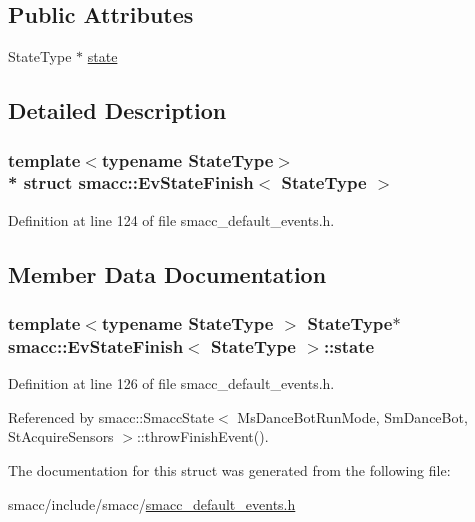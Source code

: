 \subsection*{Public Attributes}
\begin{DoxyCompactItemize}
\item 
State\+Type $\ast$ \hyperlink{structsmacc_1_1EvStateFinish_aa3a3ee44e35e32c7b803926331cb164d}{state}
\end{DoxyCompactItemize}


\subsection{Detailed Description}
\subsubsection*{template$<$typename State\+Type$>$\\*
struct smacc\+::\+Ev\+State\+Finish$<$ State\+Type $>$}



Definition at line 124 of file smacc\+\_\+default\+\_\+events.\+h.



\subsection{Member Data Documentation}
\subsubsection[{\texorpdfstring{state}{state}}]{\setlength{\rightskip}{0pt plus 5cm}template$<$typename State\+Type $>$ State\+Type$\ast$ {\bf smacc\+::\+Ev\+State\+Finish}$<$ State\+Type $>$\+::state}\hypertarget{structsmacc_1_1EvStateFinish_aa3a3ee44e35e32c7b803926331cb164d}{}\label{structsmacc_1_1EvStateFinish_aa3a3ee44e35e32c7b803926331cb164d}


Definition at line 126 of file smacc\+\_\+default\+\_\+events.\+h.



Referenced by smacc\+::\+Smacc\+State$<$ Ms\+Dance\+Bot\+Run\+Mode, Sm\+Dance\+Bot, St\+Acquire\+Sensors $>$\+::throw\+Finish\+Event().



The documentation for this struct was generated from the following file\+:\begin{DoxyCompactItemize}
\item 
smacc/include/smacc/\hyperlink{smacc__default__events_8h}{smacc\+\_\+default\+\_\+events.\+h}\end{DoxyCompactItemize}
